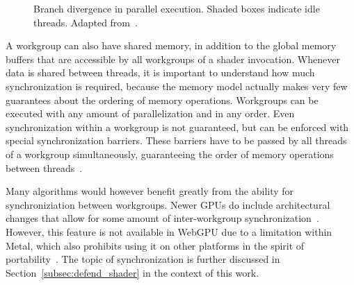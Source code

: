 \begin{figure}[ht]
\centering
{}
\caption{Branch divergence in parallel execution.
    Shaded boxes indicate idle threads. Adapted from~\cite{Hijma2023}.
}\label{fig:branching}
\end{figure}

A workgroup can also have shared memory,
in addition to the global memory buffers that are accessible by all workgroups
of a shader invocation.
Whenever data is shared between threads,
it is important to understand how much synchronization is required,
because the memory model actually makes very few guarantees about the ordering
of memory operations.
Workgroups can be executed with any amount of parallelization and in any order.
Even synchronization within a workgroup is not guaranteed,
but can be enforced with special synchronization barriers.
These barriers have to be passed by all threads of a workgroup simultaneously,
guaranteeing the order of memory operations between threads~\cite{wgsl_spec}.

Many algorithms would however benefit greatly from the ability for
synchroniziation between workgroups.
Newer GPUs do include architectural changes that allow for some amount of
inter-workgroup synchronization~\cite{Hijma2023}.
However, this feature is not available in WebGPU due to a limitation within
Metal, which also prohibits using it on other platforms in the spirit of
portability~\cite{Levien2021}.
The topic of synchronization is further discussed in
Section~\ref{subsec:defend_shader} in the context of this work.
